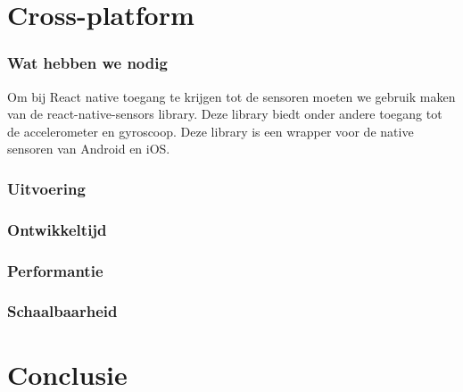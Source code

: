 


\section{Cross-platform}
\subsubsection{Wat hebben we nodig}
Om bij React native toegang te krijgen tot de sensoren moeten we gebruik maken van de react-native-sensors library.
Deze library biedt onder andere toegang tot de accelerometer en gyroscoop. Deze library is een wrapper voor de
native sensoren van Android en iOS. 

\subsubsection{Uitvoering}



\subsubsection{Ontwikkeltijd}



\subsubsection{Performantie}



\subsubsection{Schaalbaarheid}




\section{Conclusie}






















